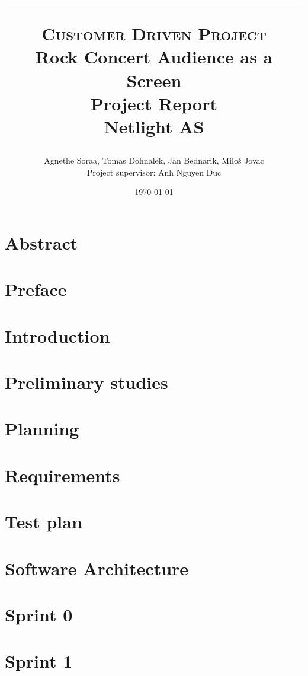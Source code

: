 \documentclass{report}
\title{
	\hrule
    \normalsize \textsc{Customer Driven Project}\\
    \Huge Rock Concert Audience as a Screen\\[10pt]
    \normalsize Project Report\\[10pt]
    Netlight AS
    \horrule{2pt}
    }
\author{Agnethe Soraa,
Tomas Dohnalek,
Jan Bednarik,
Miloš Jovac \\
\normalsize Project supervisor: Anh Nguyen Duc}
\date{\today}
\begin{document}
\maketitle
\chapter*{Abstract}


\chapter*{Preface}


\tableofcontents
\setcounter{page}{3}

\chapter{Introduction}


\chapter{Preliminary studies}


\chapter{Planning}


\chapter{Requirements}


\chapter{Test plan}


\chapter{Software Architecture}


\chapter{Sprint 0}


\chapter{Sprint 1}

\end{document}
